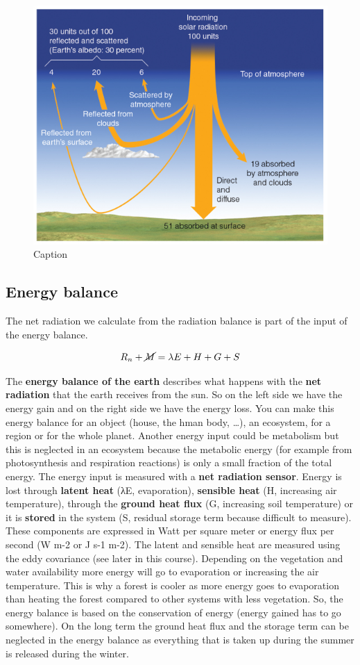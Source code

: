 \documentclass[oneside]{book}
\begin{document}
\begin{figure}

{\centering \includegraphics[width=0.5\linewidth]{figures/Figure138} 

}

\caption{Caption}\label{fig:RadiationBal}
\end{figure}

\subsection{Energy balance}\label{energy-balance-1}

The net radiation we calculate from the radiation balance is part of the
input of the energy balance.

\begin{equation} 
  R_n + \cancel{M} = \lambda E + H + G + S
  \label{eq:EqEnergyBalance}
\end{equation}

The \textbf{energy balance of the earth} describes what happens with the
\textbf{net radiation} that the earth receives from the sun. So on the
left side we have the energy gain and on the right side we have the
energy loss. You can make this energy balance for an object (house, the
hman body, \ldots{}), an ecosystem, for a region or for the whole
planet. Another energy input could be metabolism but this is neglected
in an ecosystem because the metabolic energy (for example from
photosynthesis and respiration reactions) is only a small fraction of
the total energy. The energy input is measured with a \textbf{net
radiation sensor}. Energy is lost through \textbf{latent heat} (λE,
evaporation), \textbf{sensible heat} (H, increasing air temperature),
through the \textbf{ground heat flux} (G, increasing soil temperature)
or it is \textbf{stored} in the system (S, residual storage term because
difficult to measure). These components are expressed in Watt per square
meter or energy flux per second (W m-2 or J s-1 m-2). The latent and
sensible heat are measured using the eddy covariance (see later in this
course). Depending on the vegetation and water availability more energy
will go to evaporation or increasing the air temperature. This is why a
forest is cooler as more energy goes to evaporation than heating the
forest compared to other systems with less vegetation. So, the energy
balance is based on the conservation of energy (energy gained has to go
somewhere). On the long term the ground heat flux and the storage term
can be neglected in the energy balance as everything that is taken up
during the summer is released during the winter.
\end{document}
